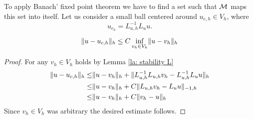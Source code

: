 To apply Banach' fixed point theorem we have to find a set such that $\mathcal M$ maps this set into itself. Let us consider a small ball centered around $u_{c,h}\in V_h$, where
\[
	u_{c_h} = L_{u,h}^{-1} L_u u.
\]

\begin{lemma}\label{la: difference u uch}
	\[
		\lVert u-u_{c,h} \rVert_{h} \leq C \inf_{v_h \in V_h} \lVert u-v_h \rVert_{h}
	\]
\end{lemma}
\begin{proof}
	For any $v_h \in V_h$ holds by Lemma \ref{la: stability L}
	\begin{align}
		\lVert u-u_{c,h} \rVert_{h} \leq& \lVert u- v_h \rVert_{h} + \lVert L_{u,h}^{-1}L_{u,h} v_h- L_{u,h}^{-1}L_u u \rVert_{h} \nonumber \\
						  \leq& \lVert u- v_h \rVert_{h} + C \lVert L_{u,h} v_h-  L_u u \rVert_{-1,h} \nonumber \\
						  \leq& \lVert u- v_h \rVert_{h} + C \lVert v_h -u \rVert_{h} \nonumber
	\end{align}
	Since $v_h \in V_h$ was arbitrary the desired estimate follows.
\end{proof}

